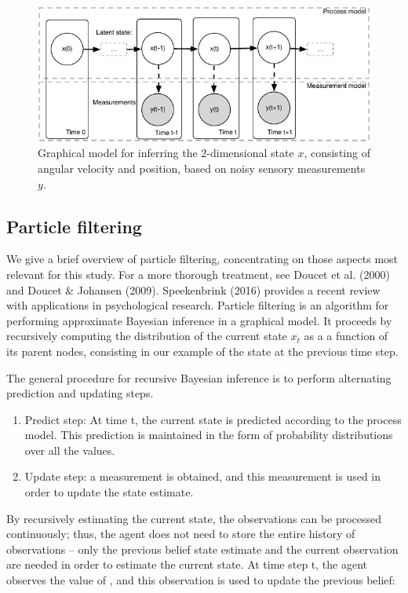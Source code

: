 \documentclass[english,floatsintext,man]{apa6}
\theoremstyle{definition}
\theoremstyle{definition}
\theoremstyle{remark}
\begin{document}
\begin{figure}
\includegraphics[width=1\linewidth]{diagrams/dynamic-belief-network-inference-1} \caption{Graphical model for inferring the 2-dimensional state $x$, consisting of angular velocity and position, based on noisy sensory measurements $y$.}\label{fig:graphical-model-inference}
\end{figure}

\subsection{Particle filtering}\label{particle-filtering}

We give a brief overview of particle filtering, concentrating on those
aspects most relevant for this study. For a more thorough treatment, see
Doucet et al. (2000) and Doucet \& Johansen (2009). Speekenbrink (2016)
provides a recent review with applications in psychological research.
Particle filtering is an algorithm for performing approximate Bayesian
inference in a graphical model. It proceeds by recursively computing the
distribution of the current state \(x_t\) as a a function of its parent
nodes, consisting in our example of the state at the previous time step.

The general procedure for recursive Bayesian inference is to perform
alternating prediction and updating steps.

\begin{enumerate}
\def\labelenumi{\arabic{enumi})}
\item
  Predict step: At time t, the current state is predicted according to
  the process model. This prediction is maintained in the form of
  probability distributions over all the values.
\item
  Update step: a measurement is obtained, and this measurement is used
  in order to update the state estimate.
\end{enumerate}

By recursively estimating the current state, the observations can be
processed continuously; thus, the agent does not need to store the
entire history of observations -- only the previous belief state
estimate and the current observation are needed in order to estimate the
current state. At time step t, the agent observes the value of , and
this observation is used to update the previous belief:
\end{document}
